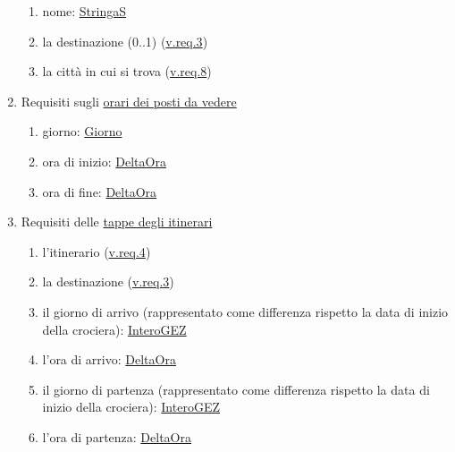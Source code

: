 \documentclass{article}
\begin{document}
\begin{enumerate}
    \begin{enumerate}
        \item nome: \hyperref[sec:StringaS]{StringaS}\label{sec:RequisitiPortoNome}
        \item la destinazione (0..1) (\hyperref[sec:RequisitiDestinazione]{v.req.3})\label{sec:RequisitiPortoDestinazione}
        \item la città in cui si trova (\hyperref[sec:RequisitiCittà]{v.req.8})\label{sec:RequisitiPortoCittà}
    \end{enumerate}
    \item Requisiti sugli \hyperref[sec:OrarioPostoDaVedere]{orari dei posti da vedere}\label{sec:RequisitiOrarioPostoDaVedere}
    \begin{enumerate}
        \item giorno: \hyperref[sec:Giorno]{Giorno}\label{sec:RequisitiOrarioPostoDaVedereGiorno}
        \item ora di inizio: \hyperref[sec:DeltaOra]{DeltaOra}\label{sec:RequisitiOrarioPostoDaVedereOraDiInizio}
        \item ora di fine: \hyperref[sec:DeltaOra]{DeltaOra}\label{sec:RequisitiOrarioPostoDaVedereOraDiFine}
    \end{enumerate}
    \item Requisiti delle \hyperref[sec:Tappa]{tappe degli itinerari}\label{sec:RequisitiTappa}
    \begin{enumerate}
        \item l'itinerario (\hyperref[sec:RequisitiItinerario]{v.req.4})\label{sec:RequisitiTappaItinerario}
        \item la destinazione (\hyperref[sec:RequisitiDestinazione]{v.req.3})\label{sec:RequisitiTappaDestinazione}
        \item il giorno di arrivo (rappresentato come differenza rispetto la data di inizio della crociera): \hyperref[sec:InteroGEZ]{InteroGEZ}\label{sec:RequisitiTappaGiornoDiArrivo}
        \item l'ora di arrivo: \hyperref[sec:DeltaOra]{DeltaOra}\label{sec:RequisitiTappaOraDiArrivo}
        \item il giorno di partenza (rappresentato come differenza rispetto la data di inizio della crociera): \hyperref[sec:InteroGEZ]{InteroGEZ}\label{sec:RequisitiTappaGiornoDiPartenza}
        \item l'ora di partenza: \hyperref[sec:DeltaOra]{DeltaOra}\label{sec:RequisitiTappaOraDiPartenza}
    \end{enumerate}
\end{enumerate}
\end{document}
